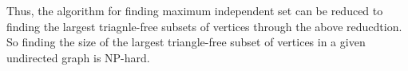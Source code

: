 \documentclass[12pt,a4paper]{article}
\begin{document}
Thus, the algorithm for finding maximum independent set can be reduced to finding the largest triagnle-free subsets of vertices through the above reducdtion. So finding the size of the largest triangle-free subset of vertices in a given undirected graph is NP-hard.




\end{document}
